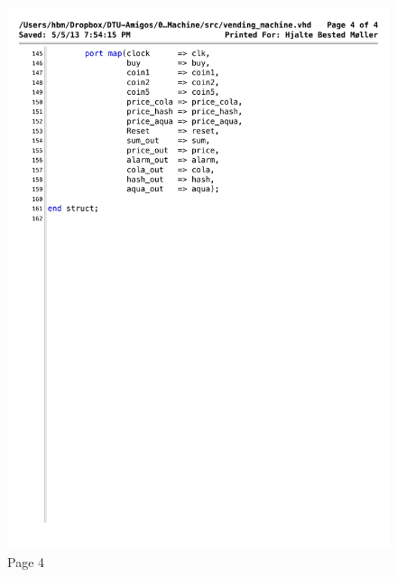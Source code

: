 \begin{figure}[!h]
\centering
\includegraphics[scale=0.6]{figs/vending_machine_4.pdf}
\caption{Page 4}
\label{vhd:vending4}
\end{figure}


